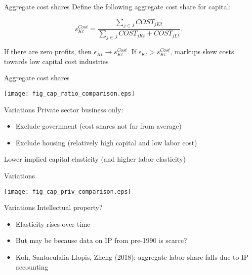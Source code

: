 \documentclass[10pt,xcolor=dvipsnames]{beamer}
\begin{document}
\begin{frame}{Aggregate cost shares}
Define the following aggregate cost share for capital:

\begin{equation}
  s^{Cost}_{Kt} = \frac{\sum_{j \in J} COST_{jKt}}{\sum_{j \in J} COST_{jKt} + COST_{jLt}}. \label{EQ_scost}
\end{equation}

If there are zero profits, then $\epsilon_{Kt} \rightarrow s^{Cost}_{Kt}$. 
\vspace{.25in}
If $\epsilon_{Kt} > s^{Cost}_{Kt}$, markups skew costs towards low capital cost industries
\end{frame}

\begin{frame}{Aggregate cost shares}
\begin{center}
\texttt{[image: fig\_cap\_ratio\_comparison.eps]}
\end{center}
\end{frame}


\begin{frame}{Variations}
Private sector business only:
\begin{itemize}
   \item Exclude government (cost shares not far from average)
   \item Exclude housing (relatively high capital and low labor cost)
\end{itemize} 

Lower implied capital elasticity (and higher labor elasticity)

\end{frame}

\begin{frame}{Variations}
\begin{center}
\texttt{[image: fig\_cap\_priv\_comparison.eps]}
\end{center}
\end{frame}


\begin{frame}{Variations}\label{Sip}
Intellectual property?

\begin{itemize}
  \item Elasticity rises over time
  \item But may be because data on IP from pre-1990 is scarce?
  \item Koh, Santaeulalia-Llopis, Zheng (2018): aggregate labor share falls due to IP accounting
\end{itemize}
\vspace{.25in} \hfill \hyperlink{Aip}{}
\end{frame}
\end{document}
